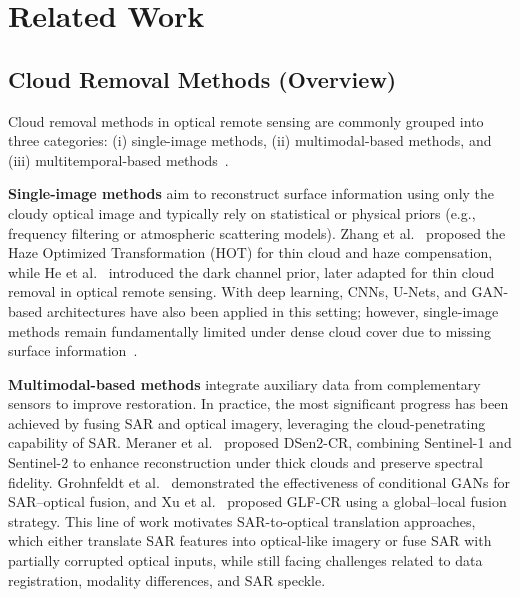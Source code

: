 \documentclass[remotesensing,article,submit,pdftex,moreauthors]{Definitions/mdpi}
\begin{document}
% 
\section{Related Work}
\subsection{Cloud Removal Methods (Overview)}
Cloud removal methods in optical remote sensing are commonly grouped into three categories: (i) single-image methods, (ii) multimodal-based methods, and (iii) multitemporal-based methods~\cite{CR_Advances_Review_ORS}.

\textbf{Single-image methods} aim to reconstruct surface information using only the cloudy optical image and typically rely on statistical or physical priors (e.g., frequency filtering or atmospheric scattering models). Zhang et al.~\cite{single_variation} proposed the Haze Optimized Transformation (HOT) for thin cloud and haze compensation, while He et al.~\cite{single_haze_removal_dark_prior} introduced the dark channel prior, later adapted for thin cloud removal in optical remote sensing. With deep learning, CNNs, U-Nets, and GAN-based architectures have also been applied in this setting; however, single-image methods remain fundamentally limited under dense cloud cover due to missing surface information~\cite{CR_Advances_Review_ORS}.

\textbf{Multimodal-based methods} integrate auxiliary data from complementary sensors to improve restoration. In practice, the most significant progress has been achieved by fusing SAR and optical imagery, leveraging the cloud-penetrating capability of SAR. Meraner et al.~\cite{CR_SEN2_dRNN} proposed DSen2-CR, combining Sentinel-1 and Sentinel-2 to enhance reconstruction under thick clouds and preserve spectral fidelity. Grohnfeldt et al.~\cite{A_cGAN_fuse_sar_MS_CR} demonstrated the effectiveness of conditional GANs for SAR–optical fusion, and Xu et al.~\cite{GLF_CR} proposed GLF-CR using a global--local fusion strategy. This line of work motivates SAR-to-optical translation approaches, which either translate SAR features into optical-like imagery or fuse SAR with partially corrupted optical inputs, while still facing challenges related to data registration, modality differences, and SAR speckle.
\end{document}
